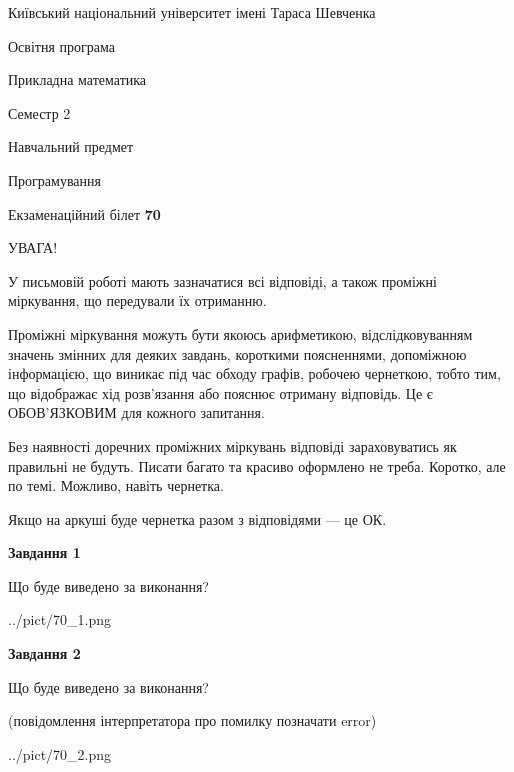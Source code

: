 \documentclass[12pt, ukrainian]{article}
\begin{document}
{{\begin {small}\par
{ \center  Київський національний університет імені Тараса Шевченка \par}
{\parbox {5 cm}{Освітня програма \hfill}{\parbox {7 cm}{Прикладна математика\hfill}}\parbox {6 cm}{\hfill Семестр 2}}\par
{\parbox {5 cm} {Навчальний предмет \hfill}\parbox {7 cm}{Програмування \hfill}\parbox {6cm}{\hfill}\par}\vspace{-7pt} \end{small}}{\center Екзаменаційний білет \No \textbf
{ 70 }\par}}
{
\begin {large}
УВАГА!

У письмовій роботі мають зазначатися всі відповіді, а також проміжні міркування, що передували їх отриманню.

Проміжні міркування можуть бути якоюсь арифметикою, відслідковуванням зна\-чень змінних для деяких завдань,
короткими поясненнями, допоміжною інформацією, що виникає під час обходу графів, робочею чернеткою,
тобто тим, що відображає хід розв’язання або пояснює отриману відповідь.
Це є ОБОВ’ЯЗКОВИМ для кожного запитання.

Без наявності доречних проміжних міркувань відповіді зараховуватись як правиль\-ні не будуть.
Писати багато та красиво оформлено не треба. Коротко, але по темі. Можли\-во, навіть чернетка.

Якщо на аркуші буде чернетка разом з відповідями --- це ОК.

\newpage

{\begin {center}\textbf{Завдання 1}\end {center}}\par
Що буде виведено за виконання?\par
\begin{center}
	{../pict/70_1.png}
\end{center}
\newpage

{\begin {center}\textbf{Завдання 2}\end {center}}\par
Що буде виведено за виконання?\par
 (повідомлення інтерпретатора про помилку позначати error)\par
\begin{center}
	{../pict/70_2.png}
\end{center}
\newpage


\end{large}}
\end{document}
